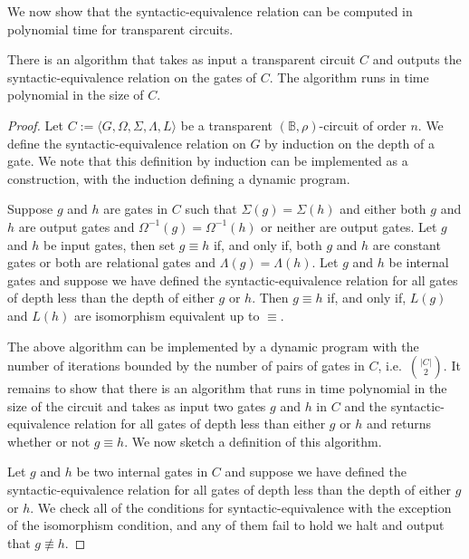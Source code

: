 \documentclass[../paper.tex]{subfiles}
\begin{document}
We now show that the syntactic-equivalence relation can be computed in
polynomial time for transparent circuits.

\begin{lem}
  There is an algorithm that takes as input a transparent circuit $C$ and
  outputs the syntactic-equivalence relation on the gates of $C$. The algorithm
  runs in time polynomial in the size of $C$.
  \label{lem:transparent-syntactic-equiv}
\end{lem}
\begin{proof}
  Let $C := \langle G, \Omega, \Sigma, \Lambda, L \rangle$ be a transparent
  $(\mathbb{B}, \rho)$-circuit of order $n$. We define the syntactic-equivalence
  relation on $G$ by induction on the depth of a gate. We note that this
  definition by induction can be implemented as a construction, with the
  induction defining a dynamic program.
  
  Suppose $g$ and $h$ are gates in $C$ such that $\Sigma (g) = \Sigma(h)$ and
  either both $g$ and $h$ are output gates and $\Omega^{-1}(g) = \Omega^{-1}(h)$
  or neither are output gates. Let $g$ and $h$ be input gates, then set $g
  \equiv h$ if, and only if, both $g$ and $h$ are constant gates or both are
  relational gates and $\Lambda(g) = \Lambda (h)$. Let $g$ and $h$ be internal
  gates and suppose we have defined the syntactic-equivalence relation for all
  gates of depth less than the depth of either $g$ or $h$. Then $g \equiv h$ if,
  and only if, $L(g)$ and $L(h)$ are isomorphism equivalent up to $\equiv$.

  The above algorithm can be implemented by a dynamic program with the number of
  iterations bounded by the number of pairs of gates in $C$, i.e.\ ${\vert C
    \vert} \choose{2}$. It remains to show that there is an algorithm that runs
  in time polynomial in the size of the circuit and takes as input two gates $g$
  and $h$ in $C$ and the syntactic-equivalence relation for all gates of depth
  less than either $g$ or $h$ and returns whether or not $g \equiv h$. We now
  sketch a definition of this algorithm.
  
  Let $g$ and $h$ be two internal gates in $C$ and suppose we have defined the
  syntactic-equivalence relation for all gates of depth less than the depth of
  either $g$ or $h$. We check all of the conditions for syntactic-equivalence
  with the exception of the isomorphism condition, and any of them fail to hold
  we halt and output that $g \not\equiv h$.


\end{proof}
\end{document}
